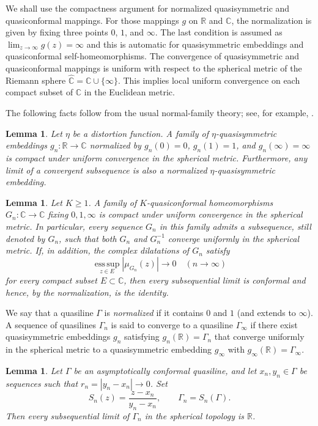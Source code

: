 \documentclass[11pt]{amsart}
\numberwithin{equation}{section}
\newtheorem{lemma}[theorem]{Lemma}
\theoremstyle{definition} %
\theoremstyle{remarkstyle}
\newcommand{\R}{\mathbb{R}}
\newcommand{\C}{\mathbb{C}}
\newcommand{\esssup}{\operatorname*{ess\,sup}}
\begin{document}
We shall use the compactness argument for normalized quasisymmetric and quasiconformal mappings.
For those mappings $g$ on $\mathbb R$ and $\mathbb C$, the normalization is given by fixing three points $0$, $1$, and $\infty$.
The last condition is assumed as $\lim_{z \to \infty} g(z)=\infty$ and this is automatic for
quasisymmetric embeddings and quasiconformal self-homeomorphisms.
The convergence of quasisymmetric and quasiconformal mappings is uniform with respect to the spherical metric of 
the Riemann sphere $\widehat{\mathbb C}=\mathbb C \cup \{\infty\}$.
This implies local uniform convergence on each compact subset of $\mathbb C$ in the Euclidean metric.

The following facts follow from the usual normal-family theory; see, for example,
\cite{Ahlfors,VaisalaQC}.

\begin{lemma}\label{lem:normal-boundary}
Let $\eta$ be a distortion function. 
A family of $\eta$-quasisymmetric embeddings $g_n\colon\R\to\C$ normalized by $g_n(0)=0$, $g_n(1)=1$, and
$g_n(\infty)=\infty$ is compact under uniform convergence in the spherical metric. 
Furthermore, any limit of a convergent subsequence is also a normalized $\eta$-quasisymmetric embedding.
\end{lemma}

\begin{lemma}\label{lem:normal-qc}
Let $K\ge1$. 
A family of $K$-quasiconformal homeomorphisms $G_n\colon\C\to\C$ fixing $0,1,\infty$ is compact under uniform convergence in the spherical metric. 
In particular, every sequence $G_n$ in this family admits a subsequence, still denoted by $G_n$, such that both $G_n$ and $G_n^{-1}$ converge uniformly in the spherical metric.
If, in addition, the complex dilatations of $G_n$ satisfy
\[
 \esssup_{z\in E}|\mu_{G_n}(z)|\to 0 \quad(n \to \infty)
\]
for every compact subset $E\subset\C$, then every subsequential limit is conformal and hence, by the normalization, is the identity.
\end{lemma}

We say that a quasiline $\Gamma$ is \emph{normalized} if it contains $0$ and $1$ (and extends to $\infty$). 
A sequence of quasilines $\Gamma_n$ is said to converge to a quasiline $\Gamma_\infty$ if there exist quasisymmetric embeddings $g_n$ satisfying $g_n(\mathbb R) = \Gamma_n$ that converge uniformly in the spherical metric to a quasisymmetric embedding $g_\infty$ with $g_\infty(\mathbb R) = \Gamma_\infty$.

\begin{lemma}\label{lem:symmetric-blowup}
Let $\Gamma$ be an asymptotically conformal quasiline, and let $x_n, y_n \in \Gamma$ be sequences such that $r_n = |y_n-x_n| \to 0$.
Set
\[
 S_n(z)=\frac{z-x_n}{y_n-x_n}, \qquad \Gamma_n=S_n(\Gamma).
\]
Then every subsequential limit of $\Gamma_n$ in the spherical topology is $\R$.
\end{lemma}
\end{document}
